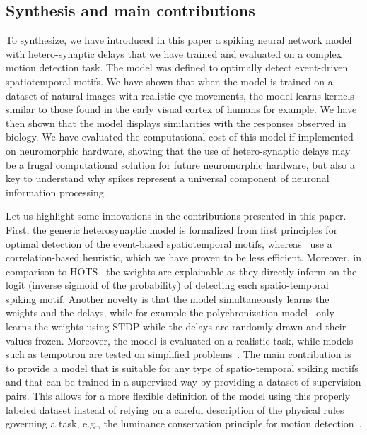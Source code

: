 \documentclass[default]{sn-jnl}%
\theoremstyle{thmstyleone}%
\theoremstyle{thmstyletwo}%
\theoremstyle{thmstylethree}%
\begin{document}
\subsection{Synthesis and main contributions}
To synthesize, we have introduced in this paper a spiking neural network model with hetero-synaptic delays that we have trained and evaluated on a complex motion detection task. The model was defined to optimally detect event-driven spatiotemporal motifs. We have shown that when the model is trained on a dataset of natural images with realistic eye movements, the model learns kernels similar to those found in the early visual cortex of humans for example. We have then shown that the model displays similarities with the responses observed in biology. We have evaluated the computational cost of this model if implemented on neuromorphic hardware, showing that the use of hetero-synaptic delays may be a frugal computational solution for future neuromorphic hardware, but also a key to understand why spikes represent a universal component of neuronal information processing.

Let us highlight some innovations in the contributions presented in this paper. First, the generic heterosynaptic model is formalized from first principles for optimal detection of the event-based spatiotemporal motifs, whereas~\citet{ghosh_spatiotemporal_2019} use a correlation-based heuristic, which we have proven to be less efficient. Moreover, in comparison to HOTS~\citep{lagorce_hots_2017} the weights are explainable as they directly inform on the logit (inverse sigmoid of the probability) of detecting each spatio-temporal spiking motif. Another novelty is that the model simultaneously learns the weights and the delays, while for example the polychronization model~\citep{izhikevich_polychronization_2006} only learns the weights using STDP while the delays are randomly drawn and their values frozen. Moreover, the model is evaluated on a realistic task, while models such as tempotron are tested on simplified problems~\citep{gutig_tempotron_2006}. The main contribution is to provide a model that is suitable for any type of spatio-temporal spiking motifs and that can be trained in a supervised way by providing a dataset of supervision pairs. This allows for a more flexible definition of the model using this properly labeled dataset instead of relying on a careful description of the physical rules governing a task, e.g., the luminance conservation principle for motion detection~\citep{benosman_asynchronous_2012, dardelet_event-by-event_2021}.
%
\end{document}

